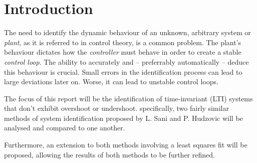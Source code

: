 \section{Introduction}

The  need  to  identify the dynamic behaviour of an unknown, arbitrary system or
\textit{plant}, as it is referred to in control theory, is a common problem. The
plant's behaviour dictates  how  the \textit{controller} must behave in order to
create  a  stable  \textit{control  loop}.  The  ability to  accurately  and  --
preferrably  automatically  -- deduce this behaviour is crucial. Small errors in
the identification process can lead to large deviations later on. Worse, it  can
lead to unstable control loops.

The focus of this report will be  the  identification  of  time-invariant  (LTI)
systems that don't exhibit overshoot  or  undershoot.  specifically,  two fairly
similar methods  of system identification proposed by L. Sani\cite{ref:sani} and
P. Hudzovic\cite{ref:hudzovic} will be  analysed  and  compared  to one another.
 
Furthermore,  an extension to both methods involving a least squares fit will be
proposed,  allowing  the  results  of   both  methods  to  be  further  refined.

